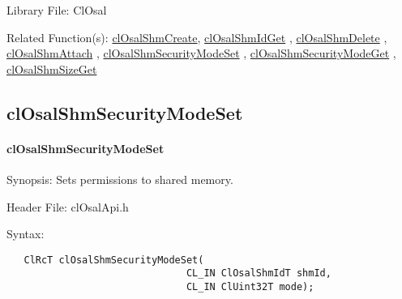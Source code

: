 \begin{Desc}
\item[Library File:]Cl\-Osal\end{Desc}
\begin{Desc}
\item[Related Function(s):]\hyperlink{pageosal145}{cl\-Osal\-Shm\-Create}, \hyperlink{pageosal146}{cl\-Osal\-Shm\-Id\-Get} , 
\hyperlink{pageosal147}{cl\-Osal\-Shm\-Delete} , \hyperlink{pageosal148}{cl\-Osal\-Shm\-Attach} , 
\hyperlink{pageosal150}{cl\-Osal\-Shm\-Security\-Mode\-Set} , \hyperlink{pageosal151}{cl\-Osal\-Shm\-Security\-Mode\-Get} , 
\hyperlink{pageosal152}{cl\-Osal\-Shm\-Size\-Get} \end{Desc}

\newpage
\subsection{clOsalShmSecurityModeSet} 
\hypertarget{pageosal150}{}\paragraph{cl\-Osal\-Shm\-Security\-Mode\-Set}\label{pageosal150}
\begin{Desc}
\item[Synopsis:]Sets permissions to shared memory.\end{Desc}
\begin{Desc}
\item[Header File:]clOsalApi.h\end{Desc}
\begin{Desc}
\item[Syntax:]\end{Desc}


\footnotesize\begin{verbatim}   ClRcT clOsalShmSecurityModeSet(
                               CL_IN ClOsalShmIdT shmId,
                               CL_IN ClUint32T mode);
\end{verbatim}
\normalsize


